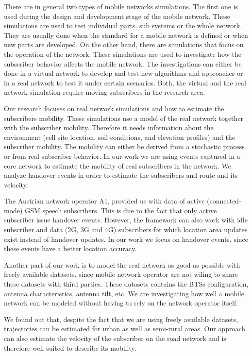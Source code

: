 \documentclass[twocolumn]{bmcart}%
\begin{document}
There are in general two types of mobile networks simulations. The first one is used during the design and development stage of the mobile network. These simulations are used to test individual parts, sub systems or the whole network. They are usually done when the standard for a mobile network is defined or when new parts are developed. On the other hand, there are simulations that focus on the operation of the network. These simulations are used to investigate how the subscriber behavior affects the mobile network. The investigations can either be done in a virtual network to develop and test new algorithms and approaches or in a real network to test it under certain scenarios. Both, the virtual and the real network simulation require moving subscribers in the research area.

Our research focuses on real network simulations and how to estimate the subscribers mobility. These simulations use a model of the real network together with the subscriber mobility. Therefore it needs information about the environment (cell site location, soil conditions, and elevation profiles) and the subscriber mobility. The mobility can either be derived from a stochastic process or from real subscriber behavior. In our work we are using events captured in a core network to estimate the mobility of real subscribers in the network. We analyze handover events in order to estimate the subscribers and route and its velocity.

The Austrian network operator A1, provided us with data of active (connected-mode) GSM speech subscribers. This is due to the fact that only active subscriber issue handover events. However, the framework can also work with idle subscriber and data (2G, 3G and 4G) subscribers for which location area updates exist instead of handover updates. In our work we focus on handover events, since these events have a better location accuracy.

Another part of our work is to model the real network as good as possible with freely available datasets, since mobile network operator are not wiling to share these datasets with third parties. These datasets contains the BTSs configuration, antenna characteristics, antenna tilt, etc. We are investigating how well a mobile network can be modeled without having to rely on the network operator itself.

We found out that, despite the fact that we are using freely available datasets, trajectories can be estimated for urban as well as semi-rural areas. Our approach can also estimate the velocity of the subscriber on the road network and is therefore well-suited to describe its mobility.
\end{document}
